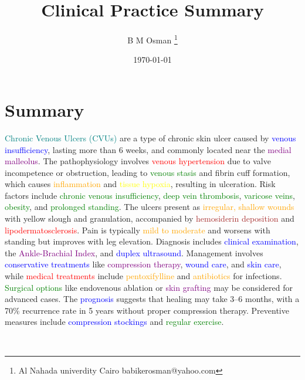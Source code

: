 \documentclass{article}
\title{Clinical Practice Summary}
\author{B M Osman  \footnote {Al Nahada univerdity Cairo \email babikerosman@yahoo.com }}
\date{\today}
\begin{document}
\maketitle

\section*{Summary}

\textcolor{teal}{Chronic Venous Ulcers (CVUs)} are a type of chronic skin ulcer caused by \textcolor{blue}{venous insufficiency}, lasting more than 6 weeks, and commonly located near the \textcolor{purple}{medial malleolus}. The pathophysiology involves \textcolor{red}{venous hypertension} due to valve incompetence or obstruction, leading to \textcolor{green}{venous stasis} and fibrin cuff formation, which causes \textcolor{orange}{inflammation} and \textcolor{yellow}{tissue hypoxia}, resulting in ulceration. Risk factors include \textcolor{green}{chronic venous insufficiency}, \textcolor{green}{deep vein thrombosis}, \textcolor{green}{varicose veins}, \textcolor{green}{obesity}, and \textcolor{green}{prolonged standing}. The ulcers present as \textcolor{orange}{irregular, shallow wounds} with yellow slough and granulation, accompanied by \textcolor{brown}{hemosiderin deposition} and \textcolor{red}{lipodermatosclerosis}. Pain is typically \textcolor{orange}{mild to moderate} and worsens with standing but improves with leg elevation. Diagnosis includes \textcolor{blue}{clinical examination}, the \textcolor{purple}{Ankle-Brachial Index}, and \textcolor{blue}{duplex ultrasound}. Management involves \textcolor{blue}{conservative treatments} like \textcolor{purple}{compression therapy}, \textcolor{blue}{wound care}, and \textcolor{blue}{skin care}, while \textcolor{red}{medical treatments} include \textcolor{orange}{pentoxifylline} and \textcolor{orange}{antibiotics} for infections. \textcolor{green}{Surgical options} like endovenous ablation or \textcolor{purple}{skin grafting} may be considered for advanced cases. The \textcolor{blue}{prognosis} suggests that healing may take 3–6 months, with a 70\% recurrence rate in 5 years without proper compression therapy. Preventive measures include \textcolor{blue}{compression stockings} and \textcolor{green}{regular exercise}.   

\\
\bigskip
\end{document}
